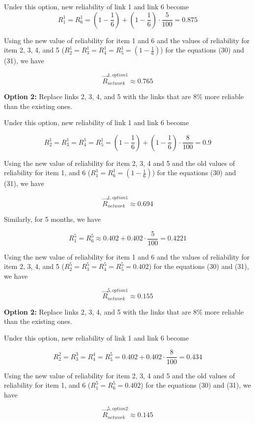 Under this option, new reliability of link 1 and link 6 become
\[
R_1^1 = R_6^1 = (1 - \frac{1}{6}) + (1 - \frac{1}{6}) \cdot \frac{5}{{100}} =
0.875
\]

Using the new value of reliability for item 1 and 6 and the values of
reliability for item 2, 3, 4, and 5 ($R_2^1 = R_3^1 = R_4^1 = R_5^1 = (1 -
\frac{1}{6})$) for the equations (30) and (31), we have

\[
 \vec R_{network}^{1,option1} \approx 0.765
\]

\textbf{Option 2:} Replace links 2, 3, 4, and 5 with the links that are 8\% more
reliable than the existing ones.

Under this option, new reliability of link 1 and link 6 become

\[
 R_2^1 = R_3^1 = R_4^1 = R_5^1 = (1 - \frac{1}{6}) + (1 - \frac{1}{6}) \cdot
\frac{8}{{100}} = 0.9
\]

Using the new value of reliability for item 2, 3, 4 and 5 and the old values of
reliability for item 1, and 6 ($R_1^1 = R_6^1 = (1 - \frac{1}{6})$) for the
equations (30) and (31), we have

\[
 \vec R_{network}^{1,option1} \approx 0.694
\]

Similarly, for 5 months, we have

\[
 R_1^5 = R_6^5 \approx 0.402 + 0.402 \cdot \frac{5}{{100}} = 0.4221
\]

Using the new value of reliability for item 1 and 6 and the values of
reliability for item 2, 3, 4, and 5 ($R_2^5 = R_3^5 = R_4^5 = R_5^5 = 0.402$) for
the equations (30) and (31), we have

\[
 \vec R_{network}^{5,option1} \approx 0.155
\]

\textbf{Option 2:} Replace links 2, 3, 4, and 5 with the links that are 8\% more
reliable than the existing ones.

Under this option, new reliability of link 1 and link 6 become

\[
 R_2^2 = R_3^3 = R_4^4 = R_5^5 = 0.402 + 0.402 \cdot \frac{8}{{100}} = 0.434
\]

Using the new value of reliability for item 2, 3, 4 and 5 and the old values of
reliability for item 1, and 6 ($R_1^5 = R_6^5 = 0.402$) for the equations (30)
and (31), we have

\[
 \vec R_{network}^{5,option2} \approx 0.145
\]

